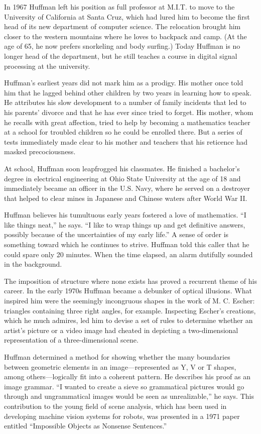 In 1967 Huffman left his position as full professor at M.I.T. to move to 
the University of California at Santa Cruz, which had lured him to become 
the first head of its new department of computer science. The relocation 
brought him closer to the western mountains where he loves to backpack and 
camp. (At the age of 65, he now prefers snorkeling and body surfing.) Today 
Huffman is no longer head of the department, but he still teaches a course 
in digital signal processing at the university.

Huffman's earliest years did not mark him as a prodigy. His mother once told 
him that he lagged behind other children by two years in learning how to 
speak. He attributes his slow development to a number of family incidents 
that led to his parents' divorce and that he has ever since tried to forget. 
His mother, whom he recalls with great affection, tried to help by becoming 
a mathematics teacher at a school for troubled children so he could be enrolled 
there. But a series of tests immediately made clear to his mother and teachers 
that his reticence had masked precociousness.

At school, Huffman soon leapfrogged his classmates. He finished a bachelor's 
degree in electrical engineering at Ohio State University at the age of 18 
and immediately became an officer in the U.S. Navy, where he served on a 
destroyer that helped to clear mines in Japanese and Chinese waters after 
World War II.

Huffman believes his tumultuous early years fostered a love of mathematics. 
``I like things neat,'' he says. ``I like to wrap things up and get definitive 
answers, possibly because of the uncertainties of my early life.'' A sense 
of order is something toward which he continues to strive. Huffman told this 
caller that he could spare only 20 minutes. When the time elapsed, an alarm 
dutifully sounded in the background.

The imposition of structure where none exists has proved a recurrent theme 
of his career. In the early 1970s Huffman became a debunker of optical illusions. 
What inspired him were the seemingly incongruous shapes in the work of M. 
C. Escher: triangles containing three right angles, for example. Inspecting 
Escher's creations, which he much admires, led him to devise a set of rules 
to determine whether an artist's picture or a video image had cheated in 
depicting a two-dimensional representation of a three-dimensional scene.

Huffman determined a method for showing whether the many boundaries between 
geometric elements in an image---represented as Y, V or T shapes, among others---logically 
fit into a coherent pattern. He describes his proof as an image grammar. 
``I wanted to create a sieve so grammatical pictures would go through and 
ungrammatical images would be seen as unrealizable,'' he says. This contribution 
to the young field of scene analysis, which has been used in developing machine 
vision systems for robots, was presented in a 1971 paper entitled ``Impossible 
Objects as Nonsense Sentences.''

